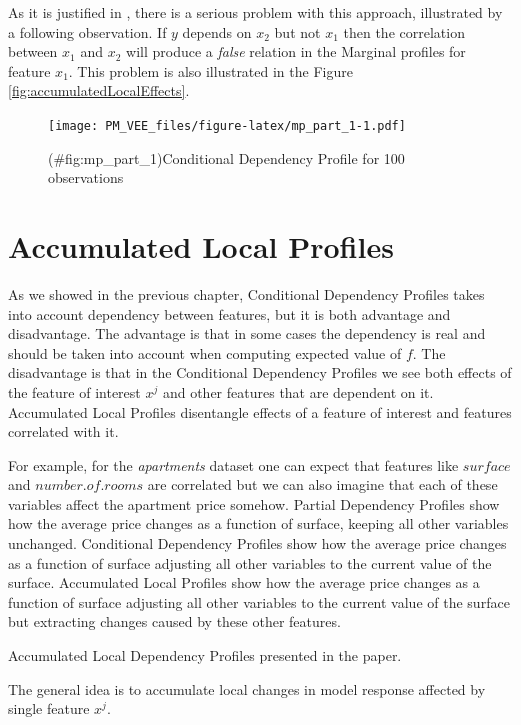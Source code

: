 \documentclass[12pt,]{krantz}
\begin{document}
As it is justified in \citep{R-ALEPlot}, there is a serious problem with this approach, illustrated by a following observation. If \(y\) depends on \(x_2\) but not \(x_1\)
then the correlation between \(x_1\) and \(x_2\)
will produce a \emph{false} relation in the Marginal profiles for feature \(x_1\). This problem is also illustrated in the Figure \ref{fig:accumulatedLocalEffects}.

\begin{figure}
\centering
\texttt{[image: PM\_VEE\_files/figure-latex/mp\_part\_1-1.pdf]}
\caption{(\#fig:mp\_part\_1)Conditional Dependency Profile for 100 observations}
\end{figure}

\hypertarget{accumulatedLocalProfiles}{%
\section{Accumulated Local Profiles}\label{accumulatedLocalProfiles}}

As we showed in the previous chapter, Conditional Dependency Profiles takes into account dependency between features, but it is both advantage and disadvantage. The advantage is that in some cases the dependency is real and should be taken into account when computing expected value of \(f\). The disadvantage is that in the Conditional Dependency Profiles we see both effects of the feature of interest \(x^j\) and other features that are dependent on it. Accumulated Local Profiles disentangle effects of a feature of interest and features correlated with it.

For example, for the \emph{apartments} dataset one can expect that features like \(surface\) and \(number.of.rooms\) are correlated but we can also imagine that each of these variables affect the apartment price somehow. Partial Dependency Profiles show how the average price changes as a function of surface, keeping all other variables unchanged. Conditional Dependency Profiles show how the average price changes as a function of surface adjusting all other variables to the current value of the surface. Accumulated Local Profiles show how the average price changes as a function of surface adjusting all other variables to the current value of the surface but extracting changes caused by these other features.

Accumulated Local Dependency Profiles presented in the \citep{R-ALEPlot} paper.

The general idea is to accumulate local changes in model response affected by single feature \(x^j\).
\end{document}
